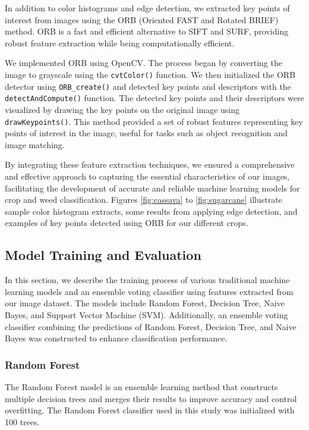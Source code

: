 \documentclass[10pt,twocolumn,letterpaper]{article}
\begin{document}
In addition to color histograms and edge detection, we extracted key points of interest from images using the ORB (Oriented FAST and Rotated BRIEF) method. ORB is a fast and efficient alternative to SIFT and SURF, providing robust feature extraction while being computationally efficient.

We implemented ORB using OpenCV. The process began by converting the image to grayscale using the \texttt{cvtColor()} function. We then initialized the ORB detector using \texttt{ORB\_create()} and detected key points and descriptors with the \texttt{detectAndCompute()} function. The detected key points and their descriptors were visualized by drawing the key points on the original image using \texttt{drawKeypoints()}. This method provided a set of robust features representing key points of interest in the image, useful for tasks such as object recognition and image matching.

By integrating these feature extraction techniques, we ensured a comprehensive and effective approach to capturing the essential characteristics of our images, facilitating the development of accurate and reliable machine learning models for crop and weed classification. Figures \ref{fig:cassava} to \ref{fig:sugarcane} illustrate sample color histogram extracts, some results from applying edge detection, and examples of key points detected using ORB for our different crops.



\subsection{Model Training and Evaluation}
In this section, we describe the training process of various traditional machine learning models and an ensemble voting classifier using features extracted from our image dataset. The models include Random Forest, Decision Tree, Naive Bayes, and Support Vector Machine (SVM). Additionally, an ensemble voting classifier combining the predictions of Random Forest, Decision Tree, and Naive Bayes was constructed to enhance classification performance.

\subsubsection{Random Forest}

The Random Forest model is an ensemble learning method that constructs multiple decision trees and merges their results to improve accuracy and control overfitting. The Random Forest classifier used in this study was initialized with 100 trees.
\end{document}
